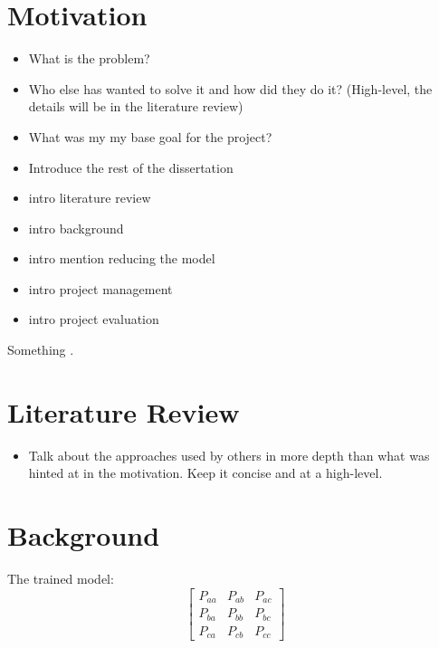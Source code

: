\documentclass[11pt, a4paper]{report}
\begin{document}
\chapter{Motivation}
\label{cha:motivation}

\begin{itemize}
\item What is the problem?
\item Who else has wanted to solve it and how did they do it?
  (High-level, the details will be in the literature review)
\item What was my my base goal for the project?
\item Introduce the rest of the dissertation
\item intro literature review
\item intro background
\item intro mention reducing the model
\item intro project management
\item intro project evaluation
\end{itemize}

Something \cite{Antonelo2008}.
\chapter{Literature Review}
\label{cha:lit-review}

\begin{itemize}
\item Talk about the approaches used by others in more depth than what
  was hinted at in the motivation. Keep it concise and at a
  high-level.
\end{itemize}

\chapter{Background}
\label{cha:background}



The trained model:
\[
\begin{bmatrix}
  P_{aa} & P_{ab} & P_{ac}\\
  P_{ba} & P_{bb} & P_{bc}\\
  P_{ca} & P_{cb} & P_{cc}
\end{bmatrix}
\]
\end{document}
